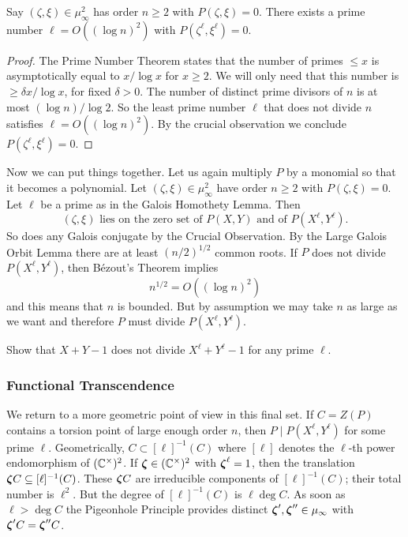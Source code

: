 \begin{lemma}
  Say $(\zeta,\xi)\in \mu_\infty^2$ has order $n\ge 2$
  with $P(\zeta,\xi)=0$. There exists a prime number $\ell=O((\log
  n)^2)$ with $P(\zeta^\ell,\xi^\ell)=0$. 
\end{lemma}
\begin{proof}
  The Prime Number Theorem states that the number of primes $\le x$ is
  asymptotically equal to $x/\log x$ for $x\ge 2$.
  We will only need that this number
  is $\ge \delta x/\log x$, for fixed $\delta >0$. 
  The number of
  distinct prime divisors of $n$ is at most $(\log n)/\log 2$.
  So the least prime number $\ell$ that does not divide $n$ satisfies $\ell =
  O((\log n)^2)$. By the crucial observation we conclude
  $P(\zeta^\ell,\xi^\ell)=0$. 
\end{proof}

Now we can put things together. Let us again multiply $P$ by a
monomial so that it becomes a polynomial.
Let $(\zeta,\xi)\in \mu_\infty^2$ have order $n\ge 2$ with
$P(\zeta,\xi)=0$. Let $\ell$ be a prime as in the Galois Homothety
Lemma.
Then
\begin{equation}
  \label{eq:intersectionGm}
  (\zeta,\xi)\text{ lies on the zero set of $P(X,Y)$ and of 
    $P(X^{\ell},Y^{\ell})$}.
\end{equation}
So does any Galois
conjugate by the Crucial Observation.
By the Large Galois Orbit Lemma there are at least
$(n/2)^{1/2}$ common roots. If $P$ does not divide $P(X^\ell,Y^\ell)$,
then B\'ezout's Theorem implies
\begin{equation*}
  n^{1/2} = O((\log n)^2)
\end{equation*}
and this means that $n$ is bounded. But by assumption we may take $n$
as large as we want and therefore $P$ must divide $P(X^\ell,Y^\ell)$.

\begin{exercise}
  Show that $X+Y-1$ does not divide  $X^\ell + Y^\ell-1$ for any prime
  $\ell$. 
\end{exercise}

\subsubsection{Functional Transcendence}
\label{subsub:functrans}

We return to a more geometric point of view in this final set.
If $C=Z(P)$ contains a torsion point of large enough order $n$, then
$P \mid P(X^\ell,Y^\ell)$ for some prime $\ell$.
Geometrically, $C \subset [\ell]^{-1}(C)$ where $[\ell]$ denotes the $\ell$-th
power endomorphism of $({\mathbb{C}}^\times)^2$.
If ${\boldsymbol{\zeta}}\in ({\mathbb{C}}^\times)^2$ with ${\boldsymbol{\zeta}}^\ell=1$, then the
translation ${\boldsymbol{\zeta}} C\subseteq [\ell]^{-1}(C)$. These ${\boldsymbol{\zeta}} C$ are
irreducible components of $[\ell]^{-1}(C)$; their total number is
$\ell^2$. But the degree of $[\ell]^{-1}(C)$ is $\ell \deg C$. As soon
as $\ell > \deg C$ the Pigeonhole Principle provides distinct
${\boldsymbol{\zeta}}',{\boldsymbol{\zeta}}''\in \mu_\infty$ with ${\boldsymbol{\zeta}}' C = {\boldsymbol{\zeta}}''C$.

